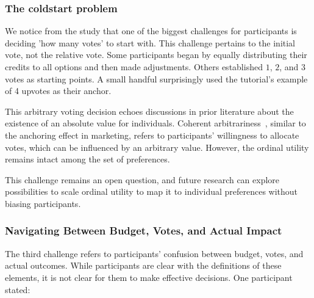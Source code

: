\subsubsection{The coldstart problem}
We notice from the study that one of the biggest challenges for participants is deciding 'how many votes' to start with. This challenge pertains to the initial vote, not the relative vote. Some participants began by equally distributing their credits to all options and then made adjustments. Others established $1$, $2$, and $3$ votes as starting points. A small handful surprisingly used the tutorial's example of 4 upvotes as their anchor.

This arbitrary voting decision echoes discussions in prior literature about the existence of an absolute value for individuals. Coherent arbitrariness~\cite{arielyCoherentArbitrarinessStable2003}, similar to the anchoring effect in marketing, refers to participants' willingness to allocate votes, which can be influenced by an arbitrary value. However, the ordinal utility remains intact among the set of preferences.

This challenge remains an open question, and future research can explore possibilities to scale ordinal utility to map it to individual preferences without biasing participants.

\subsubsection{Navigating Between Budget, Votes, and Actual Impact}
The third challenge refers to participants' confusion between budget, votes, and actual outcomes. While participants are clear with the definitions of these elements, it is not clear for them to make effective decisions. One participant stated:

